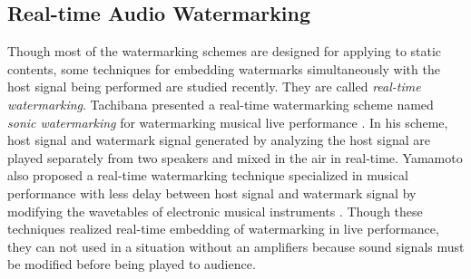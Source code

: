 \subsection{Real-time Audio Watermarking}
Though most of the watermarking schemes are designed for applying to static contents, some techniques for embedding watermarks simultaneously with the host signal being performed are studied recently. They are called {\it real-time watermarking}.
Tachibana presented a real-time watermarking scheme named {\it sonic watermarking} for watermarking musical live performance \cite{tachibana2003audio}. In his scheme, host signal and watermark signal generated by analyzing the host signal are played separately from two speakers and mixed in the air in real-time.
Yamamoto also proposed a real-time watermarking technique specialized in musical performance with less delay between host signal and watermark signal by modifying the wavetables of electronic musical instruments \cite{yamamoto2010real}.
Though these techniques realized real-time embedding of watermarking in live performance, they can not used in a situation without an amplifiers because sound signals must be modified before being played to audience.
